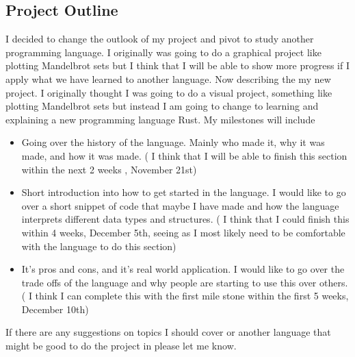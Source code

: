 \documentclass{article}
\theoremstyle{theorem}
\theoremstyle{definition}
\theoremstyle{remark}
\begin{document}
\subsection{Project Outline }
I decided to change the outlook of my project and pivot to study another programming language. I originally was going to do a graphical project like plotting Mandelbrot sets but I think that I will be able to show more progress if I apply what we have learned to another language. 
    Now describing the my new project. I originally thought I was going to do a visual project, something like plotting Mandelbrot sets but instead I am going to change to learning and explaining a new programming language Rust. My milestones will include 
    \begin{itemize}

\item Going over the history of the language. Mainly who made it, why it was made, and how it was made. ( I think that I will be able to finish this section within the next 2 weeks , November 21st) 
\item Short introduction into how to get started in the language. I would like to go over a short snippet of code that maybe I have made and how the language interprets different data types and structures. ( I think that I could finish this within 4 weeks, December 5th, seeing as I most likely need to be comfortable with the language to do this section)
\item It’s pros and cons, and it's real world application. I would like to go over the trade offs of the language and why people are starting to use this over others. ( I think I can complete this with the first mile stone within the first 5 weeks, December 10th)
\end{itemize}
If there are any suggestions on topics I should cover or another language that might be good to do the project in please let me know.
\end{document}
